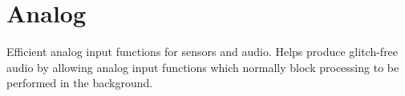 \hypertarget{group__analog}{}\section{Analog}
\label{group__analog}
Efficient analog input functions for sensors and audio. Helps produce glitch-\/free audio by allowing analog input functions which normally block processing to be performed in the background. 